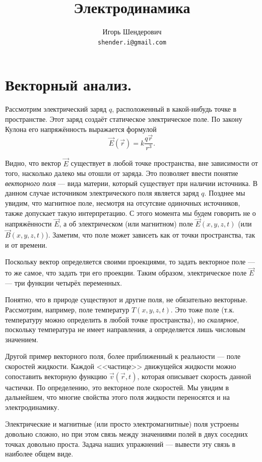 \documentclass[11pt,a4paper]{article}
\title{Электродинамика}
\author{Игорь Шендерович\\\texttt{shender.i@gmail.com}}
\numberwithin{equation}{section}
\begin{document}
\maketitle

\section{Векторный анализ.}

Рассмотрим электрический заряд $q$, расположенный в какой-нибудь точке
в пространстве. Этот заряд создаёт статическое электрическое поле. По
закону Кулона его напряжённость выражается формулой
\begin{equation}
  \label{eq:coulomb}
  \vec{E}(\vec{r}) =k \frac{q \vec{r}}{r^3}.
\end{equation}

Видно, что вектор $\vec{E}$ существует в любой точке пространства, вне
зависимости от того, насколько далеко мы отошли от заряда. Это
позволяет ввести понятие \textit{векторного поля} --- вида материи,
который существует при наличии источника. В данном случае источником
электрического поля является заряд $q$. Позднее мы увидим, что
магнитное поле, несмотря на отсутсвие одиночных источников, также
допускает такую интерпретацию. С этого момента мы будем говорить не о
напряжённости $\vec{E}$, а об электрическом (или магнитном) поле
$\vec{E}(x,y,z,t)$ (или $\vec{B}(x,y,z,t)$). Заметим, что поле может
зависеть как от точки пространства, так и от времени. 

Поскольку вектор определяется своими проекциями, то задать векторное
поле --- то же самое, что задать три его проекции. Таким образом,
электрическое поле $\vec{E}$ --- три функции четырёх переменных. 

Понятно, что в природе существуют и другие поля, не обязательно
векторные. Рассмотрим, например, поле температур $T(x,y,z,t)$. Это
тоже поле (т.к. температуру можно определить в любой точке
пространства), но \textit{скалярное}, поскольку температура не имеет
направления, а определяется лишь числовым значением. 

Другой пример векторного поля, более приближенный к реальности ---
поле скоростей жидкости. Каждой <<частице>> движущейся жидкости можно
сопоставить векторную функцию $\vec{v}(\vec{r},t)$, которая описывает
скорость данной частички. По определению, это векторное поле
скоростей. Мы увидим в дальнейшем, что многие свойства этого поля
жидкости переносятся и на электродинамику. 

Электрические и магнитные (или просто электромагнитные) поля устроены
довольно сложно, но при этом связь между значениями полей в двух
соседних точках довольно проста. Задача наших упражнений --- вывести
эту связь в наиболее общем виде. 
\end{document}
